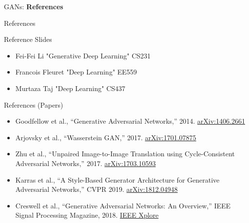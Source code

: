 \begin{frame}{}
    \LARGE GANs: \textbf{References}
\end{frame}

\begin{frame}{References}

Reference Slides
\begin{itemize}
    \item Fei-Fei Li "Generative Deep Learning" CS231
    \item Francois Fleuret "Deep Learning" EE559
    \item Murtaza Taj "Deep Learning" CS437
\end{itemize}
    
\end{frame}

\begin{frame}{References (Papers)}

\begin{itemize}
    \item Goodfellow et al., ``Generative Adversarial Networks,'' 2014. \href{https://arxiv.org/abs/1406.2661}{arXiv:1406.2661}
    \item Arjovsky et al., ``Wasserstein GAN,'' 2017. \href{https://arxiv.org/abs/1701.07875}{arXiv:1701.07875}
    \item Zhu et al., ``Unpaired Image-to-Image Translation using Cycle-Consistent Adversarial Networks,'' 2017. \href{https://arxiv.org/abs/1703.10593}{arXiv:1703.10593}
    \item Karras et al., ``A Style-Based Generator Architecture for Generative Adversarial Networks,'' CVPR 2019. \href{https://arxiv.org/abs/1812.04948}{arXiv:1812.04948}
    \item Creswell et al., ``Generative Adversarial Networks: An Overview,'' IEEE Signal Processing Magazine, 2018. \href{https://ieeexplore.ieee.org/document/8280743}{IEEE Xplore}
\end{itemize}

\end{frame}